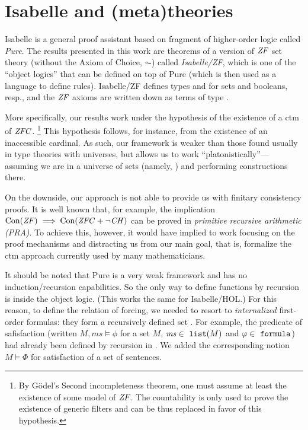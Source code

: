 \section{Isabelle and (meta)theories}
\label{sec:isabelle-metatheories}

Isabelle \cite{Isabelle,DBLP:books/sp/Paulson94} is a general proof
assistant based on fragment of higher-order logic called
\emph{Pure}. 
The results presented in this work are theorems of a
version of $\mathit{ZF}$ set theory (without the Axiom of Choice, $\AC$) 
called \emph{Isabelle/ZF}, which is one of the
``object logics'' that can be defined on top of Pure (which is then
used as a language to define rules). Isabelle/ZF defines types
 and  for sets and booleans, resp., and the $\mathit{ZF}$
axioms are written down as terms of type .

More specifically, our results work under the hypothesis of
the existence of a ctm of $\mathit{ZFC}$.%
\footnote{By Gödel's Second incompleteness theorem, one must assume at
  least the existence of some model of $\mathit{ZF}$. 
  The countability is only used to prove the existence of
  generic filters and can be thus replaced in favor of this
  hypothesis.} 
This hypothesis follows, for instance, from the existence of an
inaccessible cardinal. As such, our framework is weaker than those
found usually in type theories with universes, but allows us to work
``platonistically''--- assuming we are in a universe of sets (namely,
) and performing constructions there.

On the downside, our approach is not able to provide us with finitary
consistency proofs. It is well known that, for example, the
implication $\operatorname{Con}(\mathit{ZF}) \implies \operatorname{Con}(\mathit{ZFC}+\neg\mathit{CH})$ can be proved in
\emph{primitive recursive arithmetic (PRA)}. To achieve this, however,
it would have implied to work focusing on the proof mechanisms
and distracting us from our main goal, that is, formalize the ctm
approach currently used by many mathematicians.

It should be noted that Pure is a very weak framework and has no
induction/recursion capabilities. So the only way to define functions
by recursion is inside the object logic. (This works the same for
Isabelle/HOL.) For this reason, to define the relation of forcing, we
needed to resort to \emph{internalized} first-order formulas: they
form a recursively defined set . For example, the
predicate of safisfaction
(written $M,\mathit{ms}\models\phi$ for a set $M$,
$\mathit{ms}\in\isatt{list}(M)$ and $\phi\in\formula$)
had already been defined by recursion in \cite{paulson_2003}. We added
the corresponding notion $M\models \Phi$ for satisfaction of a set of
sentences.

